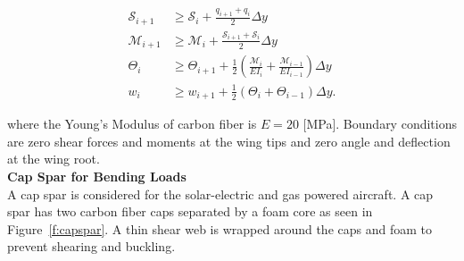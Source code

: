 % 
% 
%  

\begin{align}
    \label{e:sheargp}
    \mathcal{S}_{i+1} &\geq \mathcal{S}_i + \frac{q_{i+1} + q_i}{2} \Delta y \\
    \label{e:momentgp}
    \mathcal{M}_{i+1} &\geq \mathcal{M}_i + \frac{\mathcal{S}_{i+1} + \mathcal{S}_i}{2} \Delta y \\
    \label{e:anglegp}
    \Theta_{i} &\geq \Theta_{i+1} + \frac{1}{2} \left(\frac{\mathcal{M}_i}{EI_i} + \frac{\mathcal{M}_{i-1}}{EI_{i-1}} \right) \Delta y \\
    \label{e:deflection}
    w_{i} &\geq w_{i+1} + \frac{1}{2} (\Theta_i + \Theta_{i-1}) \Delta y .
\end{align}

where the Young's Modulus of carbon fiber is $E = 20$ [MPa]. Boundary conditions are zero shear forces and moments at the wing tips and zero angle and deflection at the wing root.\cite{bending} \\

\textbf{Cap Spar for Bending Loads} \\

A cap spar is considered for the solar-electric and gas powered aircraft.  A cap spar has two carbon fiber caps separated by a foam core as seen in Figure~\ref{f:capspar}. A thin shear web is wrapped around the caps and foam to prevent shearing and buckling.

